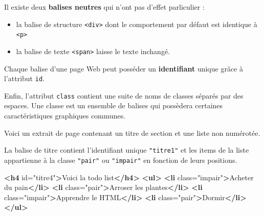 \documentclass[a4paper,17pt]{extarticle}
\providecommand{\tightlist}{%
      \setlength{\itemsep}{0pt}\setlength{\parskip}{0pt}}
\newenvironment{Shaded}{}{}
\newcommand{\KeywordTok}[1]{\textcolor[rgb]{0.00,0.44,0.13}{\textbf{{#1}}}}
\newcommand{\StringTok}[1]{\textcolor[rgb]{0.25,0.44,0.63}{{#1}}}
\newcommand{\OtherTok}[1]{\textcolor[rgb]{0.00,0.44,0.13}{{#1}}}
\newcommand{\NormalTok}[1]{{#1}}
\begin{document}
Il existe deux \textbf{balises neutres} qui n'ont pas d'effet
parliculier :

\begin{itemize}
\tightlist
\item
  la balise de structure \texttt{\textless{}div\textgreater{}} dont le
  comportement par défaut est identique à
  \texttt{\textless{}p\textgreater{}}
\item
  la balise de texte \texttt{\textless{}span\textgreater{}} laisse le
  texte inchangé.
\end{itemize}

Chaque balise d'une page Web peut posséder un \textbf{identifiant}
unique grâce à l'attribut \texttt{id}.

Enfin, l'attribut \texttt{class} contient une suite de noms de classes
séparés par des espaces. Une classe est un ensemble de balises qui
possèdera certaines caractéristiques graphiques communes.
\begin{exemple}
    Voici un extrait de page contenant un titre de section et une liste non
numérotée.

La balise de titre contient l'identifiant unique \texttt{"titre1"} et
les items de la liste appartienne à la classe \texttt{"pair"} ou
\texttt{"impair"} en fonction de leurs positions.

\begin{Shaded}
\begin{Highlighting}[]
\KeywordTok{\textless{}h4}\OtherTok{ id=}\StringTok{"titre4"}\KeywordTok{\textgreater{}}\NormalTok{Voici la todo list}\KeywordTok{\textless{}/h4\textgreater{}}
\KeywordTok{\textless{}ul\textgreater{}}
    \KeywordTok{\textless{}li}\OtherTok{ class=}\StringTok{"impair"}\KeywordTok{\textgreater{}}\NormalTok{Acheter du pain}\KeywordTok{\textless{}/li\textgreater{}}
    \KeywordTok{\textless{}li}\OtherTok{ class=}\StringTok{"pair"}\KeywordTok{\textgreater{}}\NormalTok{Arroser les plantes}\KeywordTok{\textless{}/li\textgreater{}}
    \KeywordTok{\textless{}li}\OtherTok{ class=}\StringTok{"impair"}\KeywordTok{\textgreater{}}\NormalTok{Apprendre le HTML}\KeywordTok{\textless{}/li\textgreater{}}
    \KeywordTok{\textless{}li}\OtherTok{ class=}\StringTok{"pair"}\KeywordTok{\textgreater{}}\NormalTok{Dormir}\KeywordTok{\textless{}/li\textgreater{}}
\KeywordTok{\textless{}/ul\textgreater{}}
\end{Highlighting}
\end{Shaded}

            \end{exemple}

    
    
    
\end{document}
